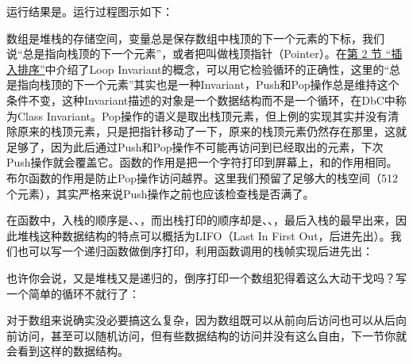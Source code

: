 


运行结果是。运行过程图示如下：




数组是堆栈的存储空间，变量总是保存数组中栈顶的下一个元素的下标，我们说“总是指向栈顶的下一个元素”，或者把叫做栈顶指针（Pointer）。在\hyperlink{db.ch11s02.id2745253}{第 2 节 “插入排序”}中介绍了Loop Invariant的概念，可以用它检验循环的正确性，这里的“总是指向栈顶的下一个元素”其实也是一种Invariant，Push和Pop操作总是维持这个条件不变，这种Invariant描述的对象是一个数据结构而不是一个循环，在DbC中称为Class Invariant。Pop操作的语义是取出栈顶元素，但上例的实现其实并没有清除原来的栈顶元素，只是把指针移动了一下，原来的栈顶元素仍然存在那里，这就足够了，因为此后通过Push和Pop操作不可能再访问到已经取出的元素，下次Push操作就会覆盖它。函数的作用是把一个字符打印到屏幕上，和的作用相同。布尔函数的作用是防止Pop操作访问越界。这里我们预留了足够大的栈空间（512个元素），其实严格来说Push操作之前也应该检查栈是否满了。



在函数中，入栈的顺序是、、，而出栈打印的顺序却是、、，最后入栈的最早出来，因此堆栈这种数据结构的特点可以概括为LIFO（Last In First Out，后进先出）。我们也可以写一个递归函数做倒序打印，利用函数调用的栈帧实现后进先出：





也许你会说，又是堆栈又是递归的，倒序打印一个数组犯得着这么大动干戈吗？写一个简单的循环不就行了：




对于数组来说确实没必要搞这么复杂，因为数组既可以从前向后访问也可以从后向前访问，甚至可以随机访问，但有些数据结构的访问并没有这么自由，下一节你就会看到这样的数据结构。

